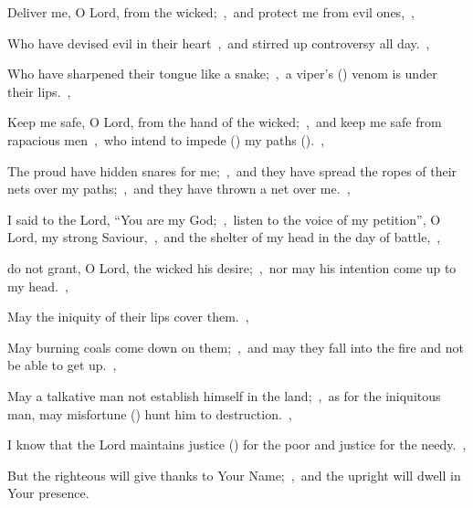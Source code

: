 \documentclass[12pt,twoside,a5paper]{article}
\begin{document}
\begin{normalparskip}
  Deliver me, O Lord, from the wicked;~\sep\ and protect me from evil ones,~\sep


  Who have devised evil in their heart~\sep\ and stirred up controversy all day.~\sep

  Who have sharpened their tongue like a snake;~\sep\ a viper's () venom is under their lips.~\sep

  Keep me safe, O Lord, from the hand of the wicked;~\sep\ and keep me safe from rapacious men~\sep\ who intend to impede () my paths ().~\sep

  The proud have hidden snares for me;~\sep\ and they have spread the ropes of their nets over my paths;~\sep\ and they have thrown a net over me.~\sep

  I said to the Lord, ``You are my God;~\sep\ listen to the voice of my petition'', O Lord, my strong Saviour,~\sep\ and the shelter of my head in the day of battle,~\sep

  do not grant, O Lord, the wicked his desire;~\sep\ nor may his intention come up to my head.~\sep

  May the iniquity of their lips cover them.~\sep

  May burning coals come down on them;~\sep\ and may they fall into the fire and not be able to get up.~\sep

  May a talkative man not establish himself in the land;~\sep\ as for the iniquitous man, may misfortune () hunt him to destruction.~\sep

  I know that the Lord maintains justice () for the poor and justice for the needy.~\sep

  But the righteous will give thanks to Your Name;~\sep\ and the upright will dwell in Your presence.
\end{normalparskip}

\end{document}
